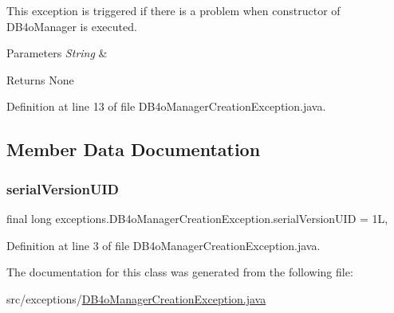 This exception is triggered if there is a problem when constructor of D\+B4o\+Manager is executed. 


\begin{DoxyParams}{Parameters}
{\em String} & \\
\hline
\end{DoxyParams}
\begin{DoxyReturn}{Returns}
None 
\end{DoxyReturn}


Definition at line 13 of file D\+B4o\+Manager\+Creation\+Exception.\+java.


\begin{DoxyCode}{0}

\end{DoxyCode}


\subsection{Member Data Documentation}
\mbox{\label{classexceptions_1_1DB4oManagerCreationException_af611b151185c866376c172feb883428a}} 
\subsubsection{\texorpdfstring{serialVersionUID}{serialVersionUID}}
{\footnotesize\ttfamily final long exceptions.\+D\+B4o\+Manager\+Creation\+Exception.\+serial\+Version\+U\+ID = 1L\hspace{0.3cm}{\ttfamily [static]}, {\ttfamily [private]}}



Definition at line 3 of file D\+B4o\+Manager\+Creation\+Exception.\+java.



The documentation for this class was generated from the following file\+:\begin{DoxyCompactItemize}
\item 
src/exceptions/\mbox{\hyperlink{DB4oManagerCreationException_8java}{D\+B4o\+Manager\+Creation\+Exception.\+java}}\end{DoxyCompactItemize}
